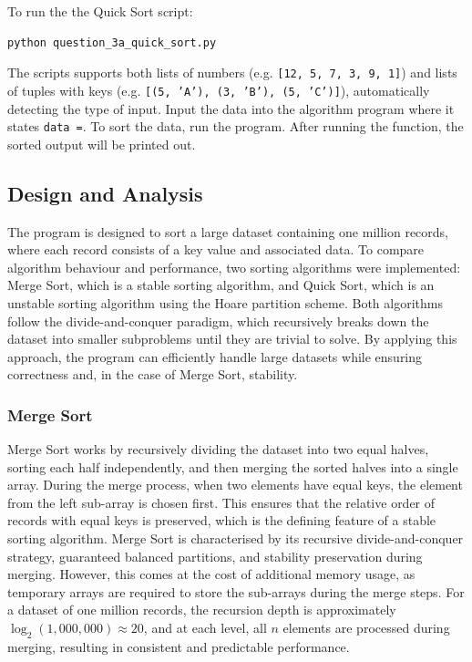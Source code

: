\documentclass[12pt]{article}
\begin{document}
\medskip
\noindent To run the the Quick Sort script:

\begin{lstlisting}[language=bash]
python question_3a_quick_sort.py
\end{lstlisting}

\medskip
\noindent The scripts supports both lists of numbers (e.g. \texttt{[12, 5, 7, 3, 9, 1]}) and lists of tuples with keys (e.g. \texttt{[(5, 'A'), (3, 'B'), (5, 'C')]}), automatically detecting the type of input. Input the data into the algorithm program where it states \texttt{data =}. To sort the data, run the program. After running the function, the sorted output will be printed out.

\subsection{Design and Analysis}

The program is designed to sort a large dataset containing one million records, where each record
consists of a key value and associated data. To compare algorithm behaviour and performance,
two sorting algorithms were implemented: Merge Sort, which is a stable sorting algorithm, and
Quick Sort, which is an unstable sorting algorithm using the Hoare partition scheme\parencite{opengenus_hoare_partition,roy2024lomuto_vs_hoare_medium}. Both
algorithms follow the divide-and-conquer paradigm, which recursively breaks down the dataset
into smaller subproblems until they are trivial to solve. By applying this approach, the program
can efficiently handle large datasets while ensuring correctness and, in the case of Merge Sort,
stability.

\subsubsection{Merge Sort}

Merge Sort works by recursively dividing the dataset into two equal halves, sorting each half
independently, and then merging the sorted halves into a single array. During the merge process,
when two elements have equal keys, the element from the left sub-array is chosen first. This
ensures that the relative order of records with equal keys is preserved, which is the defining feature of a stable sorting algorithm\parencite{rizvi2024sorting_algorithms_in_focus}. Merge Sort is characterised by its recursive
divide-and-conquer strategy, guaranteed balanced partitions, and stability preservation during
merging. However, this comes at the cost of additional memory usage, as temporary arrays are
required to store the sub-arrays during the merge steps. For a dataset of one million records, the
recursion depth is approximately $\log_{2}(1{,}000{,}000) \approx 20$, and at each level, all $n$ elements
are processed during merging, resulting in consistent and predictable performance.
\end{document}
